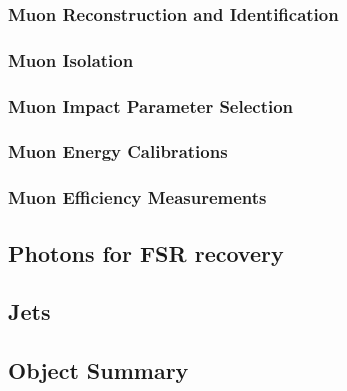 \subsubsection{Muon Reconstruction and Identification}
\label{sec:muonReco}


\subsubsection{Muon Isolation}
\label{sec:muoniso}


\subsubsection{Muon Impact Parameter Selection}                                                                                                                                                                                                 
\label{sec:muSIP}  


\subsubsection{Muon Energy Calibrations}
 

\subsubsection{Muon Efficiency Measurements}
\label{sec:muonEffMeas}



%

\clearpage

\subsection{Photons for FSR recovery}
\label{sec:FSRphotons}


\subsection{Jets}
\label{sec:jets}


\clearpage
\subsection{Object Summary}
\label{sec:objsum}

